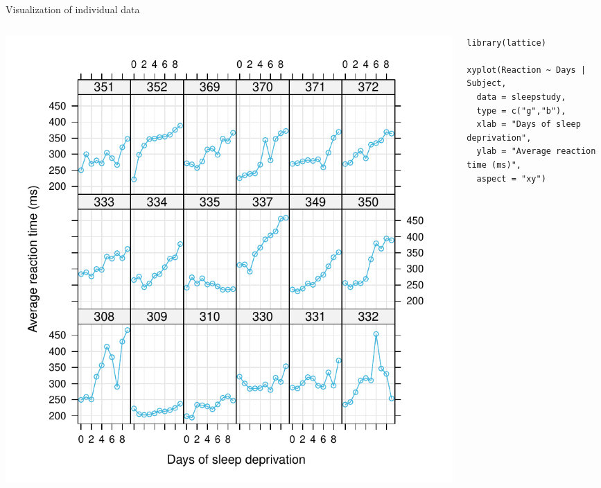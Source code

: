 \documentclass[aspectratio=169]{beamer}
\begin{document}
\begin{frame}[fragile]{Visualization of individual data}
  \begin{columns}
    \begin{column}{.53\textwidth}
      \includegraphics[scale=.5]{../figures/sleep_subjects}
    \end{column}
    \begin{column}{.55\textwidth}
\begin{lstlisting}
library(lattice)

xyplot(Reaction ~ Days | Subject,
  data = sleepstudy,
  type = c("g","b"),
  xlab = "Days of sleep deprivation",
  ylab = "Average reaction time (ms)",
  aspect = "xy")
\end{lstlisting}
    \end{column}
  \end{columns}
\end{frame}
\end{document}
